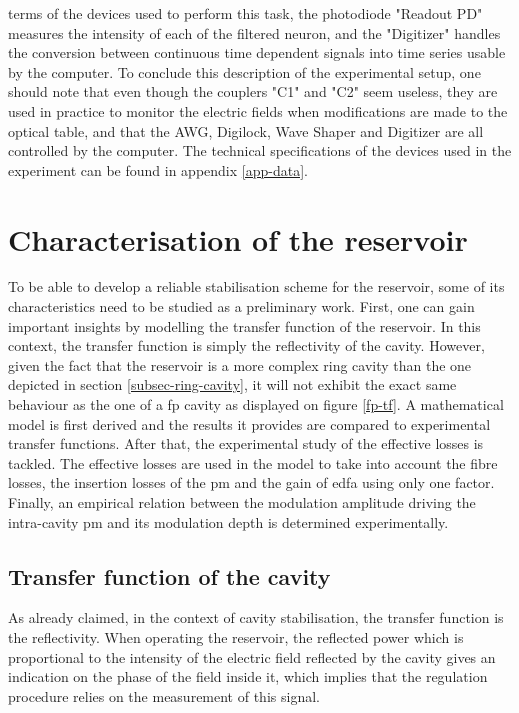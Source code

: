 terms of the devices used to perform this task, the photodiode "Readout PD" measures the intensity of each of the filtered neuron, and the "Digitizer" handles the conversion between continuous time dependent signals into time series usable by the computer. To conclude this description of the experimental setup, one should note that even though the couplers "C1" and "C2" seem useless, they are used in practice to monitor the electric fields when modifications are made to the optical table, and that the AWG, Digilock, Wave Shaper and Digitizer are all controlled by the computer. The technical specifications of the devices used in the experiment can be found in appendix \ref{app-data}.


\section{Characterisation of the reservoir}

To be able to develop a reliable stabilisation scheme for the reservoir, some of its characteristics need to be studied as a preliminary work. First, one can gain important insights by modelling the transfer function of the reservoir. In this context, the transfer function is simply the reflectivity of the cavity. However, given the fact that the reservoir is a more complex ring cavity than the one depicted in section \ref{subsec-ring-cavity}, it will not exhibit the exact same behaviour as the one of a \gls{fp} cavity as displayed on figure \ref{fp-tf}. A mathematical model is first derived and the results it provides are compared to experimental transfer functions. After that, the experimental study of the effective losses is tackled. The effective losses are used in the model to take into account the fibre losses, the insertion losses of the \gls{pm} and the gain of \gls{edfa} using only one factor. Finally, an empirical relation between the modulation amplitude driving the intra-cavity \gls{pm} and its modulation depth is determined experimentally.


\subsection{Transfer function of the cavity}

As already claimed, in the context of cavity stabilisation, the transfer function is the reflectivity. When operating the reservoir, the reflected power which is proportional to the intensity of the electric field reflected by the cavity gives an indication on the phase of the field inside it, which implies that the regulation procedure relies on the measurement of this signal. \\

